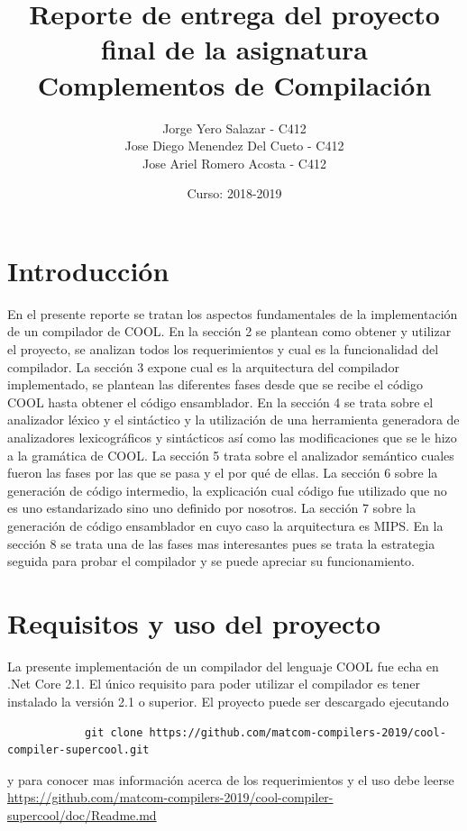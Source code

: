 \documentclass[12pt,a4paper]{article}
\author{Jorge Yero Salazar - C412\\ Jose Diego Menendez Del Cueto - C412\\ Jose Ariel Romero Acosta - C412}
\title{Reporte de entrega del proyecto final de la
	asignatura Complementos de Compilación}
\date{Curso: 2018-2019}
\begin{document}
	\maketitle
	\tableofcontents
	\newpage
	\section{Introducción}
		En el presente reporte se tratan los aspectos fundamentales de la implementación de un compilador de COOL. En la sección 2 se plantean como obtener y utilizar el proyecto, se analizan todos los requerimientos y cual es la funcionalidad del compilador. La sección 3 expone cual es la arquitectura del compilador implementado, se plantean las diferentes fases desde que se recibe el código COOL hasta obtener el código ensamblador. En la sección 4 se trata sobre el analizador léxico y el sintáctico y la utilización de una herramienta generadora de analizadores lexicográficos y sintácticos así como las modificaciones que se le hizo a la gramática de COOL. La sección 5 trata sobre el analizador semántico cuales fueron las fases por las que se pasa y el por qué de ellas. La sección 6 sobre la generación de código intermedio, la explicación cual código fue utilizado que no es uno estandarizado sino uno definido por nosotros. La sección 7 sobre la generación de código ensamblador en cuyo caso la arquitectura es MIPS. En la sección 8 se trata una de las fases mas interesantes pues se trata la estrategia seguida para probar el compilador y se puede apreciar su funcionamiento.
	\section{Requisitos y uso del proyecto}
		La presente implementación de un compilador del lenguaje COOL fue echa en
		.Net Core 2.1. El único requisito para poder utilizar el compilador es tener instalado la versión 2.1 o superior. El proyecto puede ser descargado ejecutando 
		\begin{lstlisting}
			git clone https://github.com/matcom-compilers-2019/cool-compiler-supercool.git
		\end{lstlisting}
		y para conocer mas información acerca de los requerimientos y el uso debe leerse \url{https://github.com/matcom-compilers-2019/cool-compiler-supercool/doc/Readme.md}
\end{document}
